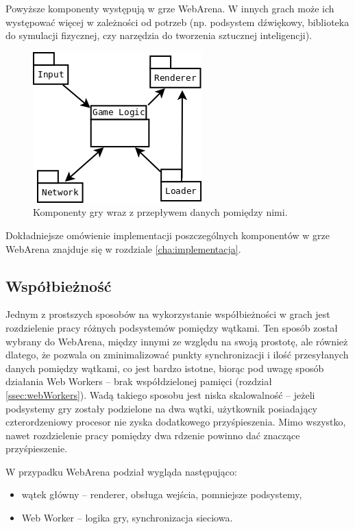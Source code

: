 Powyższe komponenty występują w grze WebArena. W innych grach może ich występować więcej
w zależności od potrzeb (np. podsystem dźwiękowy, biblioteka do symulacji fizycznej,
czy narzędzia do tworzenia sztucznej inteligencji).

\begin{figure}[h]
  \centering
  \includegraphics[scale=1]{zasoby/rozdzial3/budowa}
  \caption{Komponenty gry wraz z przepływem danych pomiędzy nimi.}
  \label{fig:multiplayer}
\end{figure}

Dokładniejsze omówienie implementacji poszczególnych komponentów w grze WebArena znajduje
się w rozdziale \ref{cha:implementacja}.

\subsection{Współbieżność}
\label{ssec:wspolbieznosc}

Jednym z prostszych sposobów na wykorzystanie współbieżności w grach jest
rozdzielenie pracy różnych podsystemów pomiędzy wątkami. Ten sposób został
wybrany do WebArena, między innymi ze względu na swoją prostotę,
ale również dlatego, że pozwala on zminimalizować punkty synchronizacji
i ilość przesyłanych danych pomiędzy wątkami, co jest bardzo istotne,
biorąc pod uwagę sposób działania Web Workers -- brak współdzielonej
pamięci (rozdział \ref{ssec:webWorkers}). Wadą takiego sposobu jest
niska skalowalność -- jeżeli podsystemy gry zostały podzielone na dwa
wątki, użytkownik posiadający czterordzeniowy procesor nie zyska
dodatkowego przyśpieszenia. Mimo wszystko, nawet rozdzielenie pracy
pomiędzy dwa rdzenie powinno dać znaczące przyśpieszenie.

W przypadku WebArena podział wygląda następująco:
\begin{itemize}
\item wątek główny -- renderer, obsługa wejścia, pomniejsze podsystemy,
\item Web Worker -- logika gry, synchronizacja sieciowa.
\end{itemize}

